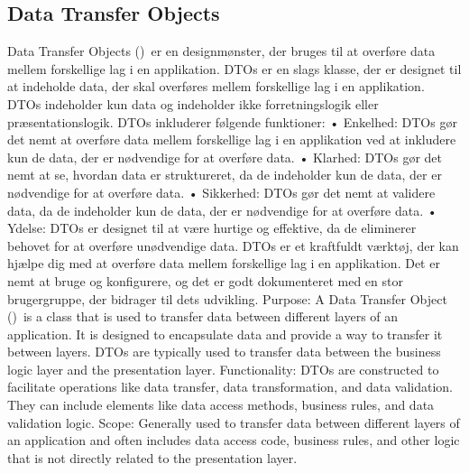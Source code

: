 \subsection{Data Transfer Objects}
Data Transfer Objects (\DTOs)\ er en designmønster, der bruges til at overføre data mellem forskellige lag i en applikation. DTOs er en slags klasse, der er designet til at indeholde data, der skal overføres mellem forskellige lag i en applikation. 
DTOs indeholder kun data og indeholder ikke forretningslogik eller præsentationslogik.
DTOs inkluderer følgende funktioner:
•	Enkelhed: DTOs gør det nemt at overføre data mellem forskellige lag i en applikation ved at inkludere kun de data, der er nødvendige for at overføre data.
•	Klarhed: DTOs gør det nemt at se, hvordan data er struktureret, da de indeholder kun de data, der er nødvendige for at overføre data.
•	Sikkerhed: DTOs gør det nemt at validere data, da de indeholder kun de data, der er nødvendige for at overføre data.
•	Ydelse: DTOs er designet til at være hurtige og effektive, da de eliminerer behovet for at overføre unødvendige data.
DTOs er et kraftfuldt værktøj, der kan hjælpe dig med at overføre data mellem forskellige lag i en applikation. Det er nemt at bruge og konfigurere, og det er godt dokumenteret med en stor brugergruppe, der bidrager til dets udvikling.
Purpose: A Data Transfer Object (\DTO)\ is a class that is used to transfer data between different layers of an application. It is designed to encapsulate data and provide a way to transfer it between layers. DTOs are typically used to transfer data between the business logic layer and the presentation layer.
Functionality: DTOs are constructed to facilitate operations like data transfer, data transformation, and data validation. They can include elements like data access methods, business rules, and data validation logic.
Scope: Generally used to transfer data between different layers of an application and often includes data access code, business rules, and other logic that is not directly related to the presentation layer.

